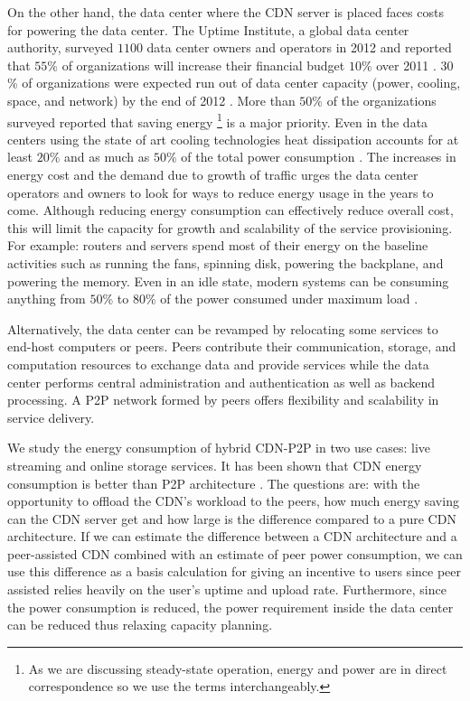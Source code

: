 On the other hand, the data center where the CDN server is placed faces costs for powering the data center. 
The Uptime Institute, a global data center authority, surveyed $1100$ data center owners and operators in 2012 and reported that $55$\% of organizations will increase their financial budget $10$\% over 2011 \cite{uptime}.
$30$\% of organizations were expected run out of data center capacity (power, cooling, space, and network) by the end of 2012 \cite{uptime}.  
More than $50$\% of the organizations surveyed reported that saving energy \footnote{As we are discussing steady-state operation, energy and power are in direct correspondence so we use the terms interchangeably.}  is a major priority. 
Even in the data centers using the state of art cooling technologies heat dissipation accounts for at least $20$\% and as much as $50$\% of the total power consumption \cite{google}. 
The increases in energy cost and the demand due to growth of traffic urges the data center operators and owners to look for ways to reduce energy usage in the years to come. 
Although reducing energy consumption can effectively reduce overall cost, this will limit the capacity for growth and scalability of the service provisioning. 
For example: routers and servers spend most of their energy on the baseline activities such as running the fans, spinning disk, powering the backplane, and powering the memory. 
Even in an idle state, modern systems can be consuming anything from $50$\% to $80$\% of the power consumed under maximum load \cite{4404806,4509688}. 

Alternatively, the data center can be revamped by relocating some services to end-host computers or peers. 
Peers contribute their communication, storage, and computation resources to exchange data and provide services while the data center performs central administration and authentication as well as backend processing. 
A P2P network formed by peers offers flexibility and scalability in service delivery. 

We study the energy consumption of hybrid CDN-P2P in two use cases: live streaming and online storage services.  
It has been shown that CDN energy consumption is better than P2P architecture \cite{feldmann2010energy,baliga2007energy}. 
The questions are: with the opportunity to offload the CDN’s workload to the peers, how much energy saving can the CDN server get and how large is the difference compared to a pure CDN architecture.  
If we can estimate the difference between a CDN architecture and a peer-assisted CDN combined with an estimate of peer power consumption, we can use this difference as a basis calculation for giving an incentive to users since peer assisted relies heavily on the user’s uptime and upload rate. 
Furthermore, since the power consumption is reduced, the power requirement inside the data center can be reduced thus relaxing capacity planning. 


